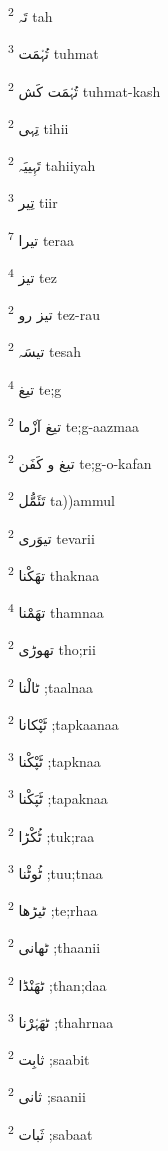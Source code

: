 \documentclass[12pt]{article}
\begin{document}
\begin{multicols}{5}
{\ur تَہ}   \textsuperscript{2} tah

{\ur تُہْمَت}   \textsuperscript{3} tuhmat

{\ur تُہْمَت کَش}   \textsuperscript{2} tuhmat-kash

{\ur تِہی}   \textsuperscript{2} tihii

{\ur تَہِییَہ}   \textsuperscript{2} tahiiyah

{\ur تِیر}   \textsuperscript{3} tiir

{\ur تیرا}   \textsuperscript{7} teraa

{\ur تیز}   \textsuperscript{4} tez

{\ur تیز رو}   \textsuperscript{2} tez-rau

{\ur تیسَہ}   \textsuperscript{2} tesah

{\ur تیغ}   \textsuperscript{4} te;g

{\ur تیغ آزْما}   \textsuperscript{2} te;g-aazmaa

{\ur تیغ و کَفَن}   \textsuperscript{2} te;g-o-kafan

{\ur تَئَمُّل}   \textsuperscript{2} ta))ammul

{\ur تیوَری}   \textsuperscript{2} tevarii

{\ur تھَکْنا}   \textsuperscript{2} thaknaa

{\ur تھَمْنا}   \textsuperscript{4} thamnaa

{\ur تھوڑی}   \textsuperscript{2} tho;rii

{\ur ٹالْنا}   \textsuperscript{2} ;taalnaa

{\ur ٹَپْکانا}   \textsuperscript{2} ;tapkaanaa

{\ur ٹَپْکْنا}   \textsuperscript{3} ;tapknaa

{\ur ٹَپَکْنا}   \textsuperscript{3} ;tapaknaa

{\ur ٹُکْڑا}   \textsuperscript{2} ;tuk;raa

{\ur ٹُوٹْنا}   \textsuperscript{3} ;tuu;tnaa

{\ur ٹیڑھا}   \textsuperscript{2} ;te;rhaa

{\ur ٹھانی}   \textsuperscript{2} ;thaanii

{\ur ٹھَنْڈا}   \textsuperscript{2} ;than;daa

{\ur ٹھَہْرْنا}   \textsuperscript{3} ;thahrnaa

{\ur ثابِت}   \textsuperscript{2} ;saabit

{\ur ثانی}   \textsuperscript{2} ;saanii

{\ur ثَبات}   \textsuperscript{2} ;sabaat


\end{multicols}
\end{document}
